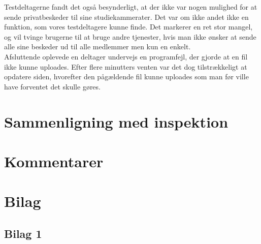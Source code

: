 \documentclass[12pt]{article}
\begin{document}
\newpage

\noindent Testdeltagerne fandt det også besynderligt, at der ikke var nogen mulighed for at sende privatbeskeder til sine studiekammerater. Det var om ikke andet ikke en funktion, som vores testdeltagere kunne finde. Det markerer en ret stor mangel, og vil tvinge brugerne til at bruge andre tjenester, hvis man ikke ønsker at sende alle sine beskeder ud til alle medlemmer men kun en enkelt.\\

\noindent Afsluttende oplevede en deltager undervejs en programfejl, der gjorde at en fil ikke kunne uploades. Efter flere minutters venten var det dog tilstrækkeligt at opdatere siden, hvorefter den pågældende fil kunne uploades som man før ville have forventet det skulle gøres.
\section{Sammenligning med inspektion}

\section{Kommentarer}

\section{Bilag}
\subsection*{Bilag 1}
\end{document}
